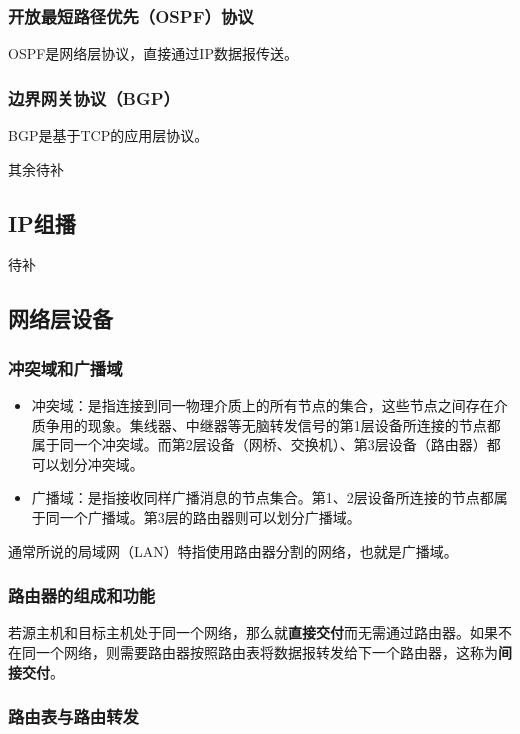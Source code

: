 \documentclass[12pt, a4paper, oneside]{ctexart}
\begin{document}
\subsubsection{开放最短路径优先（OSPF）协议}

OSPF是网络层协议，直接通过IP数据报传送。

\subsubsection{边界网关协议（BGP）}

BGP是基于TCP的应用层协议。

其余待补

\subsection{IP组播}

待补

\subsection{网络层设备}

\subsubsection{冲突域和广播域}

\begin{itemize}
    \item 冲突域：是指连接到同一物理介质上的所有节点的集合，这些节点之间存在介质争用的现象。集线器、中继器等无脑转发信号的第1层设备所连接的节点都属于同一个冲突域。而第2层设备（网桥、交换机）、第3层设备（路由器）都可以划分冲突域。
    \item 广播域：是指接收同样广播消息的节点集合。第1、2层设备所连接的节点都属于同一个广播域。第3层的路由器则可以划分广播域。
\end{itemize}
通常所说的局域网（LAN）特指使用路由器分割的网络，也就是广播域。

\subsubsection{路由器的组成和功能}

若源主机和目标主机处于同一个网络，那么就\textbf{直接交付}而无需通过路由器。如果不在同一个网络，则需要路由器按照路由表将数据报转发给下一个路由器，这称为\textbf{间接交付}。

\subsubsection{路由表与路由转发}
\end{document}

